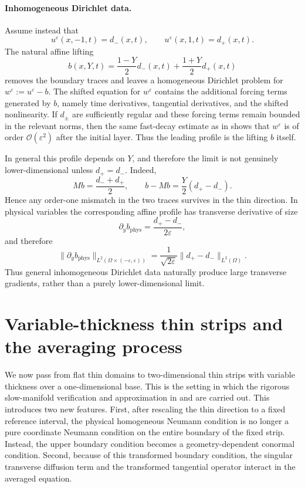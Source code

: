 \documentclass[11pt]{article}
\theoremstyle{definition}
\theoremstyle{remark}
\numberwithin{equation}{section}
\newcommand{\eps}{\varepsilon}
\newcommand{\mc}[1]{\mathcal{#1}}
\begin{document}
\paragraph{Inhomogeneous Dirichlet data.}
Assume instead that
\[
u^\eps(x,-1,t)=d_-(x,t),
\qquad
u^\eps(x,1,t)=d_+(x,t).
\]
The natural affine lifting
\[
b(x,Y,t)=\frac{1-Y}{2}d_-(x,t)+\frac{1+Y}{2}d_+(x,t)
\]
removes the boundary traces and leaves a homogeneous Dirichlet problem for \(w^\eps:=u^\eps-b\).
The shifted equation for $w^\eps$ contains the additional forcing terms generated by $b$, namely time derivatives, tangential derivatives, and the shifted nonlinearity. If $d_\pm$ are sufficiently regular and these forcing terms remain bounded in the relevant norms, then the same fast-decay estimate as in  shows that $w^\eps$ is of order $\mc O(\eps^2)$ after the initial layer. Thus the leading profile is the lifting $b$ itself.

In general this profile depends on $Y$, and therefore the limit is not genuinely lower-dimensional unless $d_+=d_-$. Indeed,
\[
Mb=\frac{d_-+d_+}{2},
\qquad
b-Mb=\frac{Y}{2}(d_+-d_-).
\]
Hence any order-one mismatch in the two traces survives in the thin direction. In physical variables the corresponding affine profile has transverse derivative of size
\[
\partial_y b_{\mathrm{phys}}
=
\frac{d_+-d_-}{2\eps},
\]
and therefore
\[
\|\partial_y b_{\mathrm{phys}}\|_{L^2(\Omega\times(-\eps,\eps))}
=
\frac{1}{\sqrt{2\eps}}\|d_+-d_-\|_{L^2(\Omega)}.
\]
Thus general inhomogeneous Dirichlet data naturally produce large transverse gradients, rather than a purely lower-dimensional limit.

\section{Variable-thickness thin strips and the averaging process}\label{sec:general-thin}

We now pass from flat thin domains to two-dimensional thin strips with
variable thickness over a one-dimensional base. 
This is the setting in which the rigorous slow-manifold verification and approximation in  and  are carried out.
This introduces two new features. 
First, after rescaling the thin direction to a fixed reference interval, the physical homogeneous Neumann condition is no longer a pure coordinate Neumann condition on the entire boundary of the fixed strip.
Instead, the upper boundary condition becomes a geometry-dependent conormal condition.
Second, because of this transformed boundary condition, the singular transverse diffusion term and the transformed tangential operator interact in the averaged equation.
\end{document}
